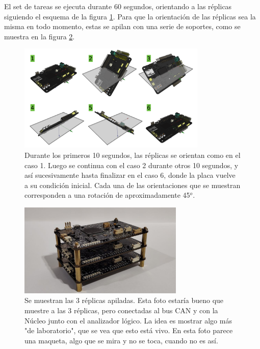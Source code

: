 El set de tareas se ejecuta durante 60 segundos, orientando a las réplicas siguiendo el esquema de la figura \ref{fig:orientaciones_prueba}. Para que la orientación de las réplicas sea la misma en todo momento, estas se apilan con una serie de soportes, como se muestra en la figura \ref{fig:pruebas_stackeadas}.

\begin{figure}[htb]
    \centering
    \includegraphics[width=0.8\textwidth]{img/orientaciones_prueba.png}
    \caption{Durante los primeros 10 segundos, las réplicas se orientan como en el caso 1. Luego se continua con el caso 2 durante otros 10 segundos, y así sucesivamente hasta finalizar en el caso 6, donde la placa vuelve a su condición inicial. Cada una de las orientaciones que se muestran corresponden a una rotación de aproximadamente 45$^o$.}
    \label{fig:orientaciones_prueba}
\end{figure}

\begin{figure}[htb]
    \centering
    \includegraphics[width=0.7\textwidth]{img/pruebas_stackeadas.png}
    \caption{Se muestran las 3 réplicas apiladas. {\color{red} Esta foto estaría bueno que muestre a las 3 réplicas, pero conectadas al bus CAN y con la Núcleo junto con el analizador lógico. La idea es mostrar algo más "de laboratorio", que se vea que esto está vivo. En esta foto parece una maqueta, algo que se mira y no se toca, cuando no es así.}}
    \label{fig:pruebas_stackeadas}
\end{figure}

